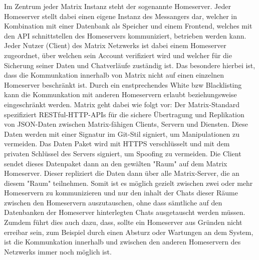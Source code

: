 Im Zentrum jeder Matrix Instanz steht der sogenannte Homeserver. Jeder Homeserver stellt dabei einen eigene Instanz des Messangers dar, welcher in Kombination mit einer Datenbank als Speicher und einem Frontend, welches mit den API schnittstellen des Homeservers kommuniziert, betrieben werden kann. Jeder Nutzer (Client) des Matrix Netzwerks ist dabei einem Homeserver zugeordnet, über welchen sein Account verifiziert wird und welcher für die Sicherung seiner Daten und Chatverläufe zuständig ist. Das besondere hierbei ist, dass die Kommunkation innerhalb von Matrix nicht auf einen einzelnen Homeserver beschränkt ist. Durch ein enstprechendes White bzw Blacklisting kann die Kommunkation mit anderen Homeservern erlaubt beziehungsweise eingeschränkt werden. Matrix geht dabei wie folgt vor:
Der Matrix-Standard spezifiziert RESTful-HTTP-APIs für die sichere Übertragung und Replikation von JSON-Daten zwischen Matrix-fähigen Clients, Servern und Diensten. Diese Daten werden mit einer Signatur im Git-Stil signiert, um Manipulationen zu vermeiden. Das Daten Paket wird mit HTTPS verschlüsselt und mit dem privaten Schlüssel des Servers signiert, um Spoofing zu vermeiden.
Die Client sendet dieses Datenpaket dann an den gewälten "Raum" auf dem Matrix Homeserver. Dieser repliziert die Daten dann über alle Matrix-Server, die an diesem "Raum" teilnehmen. Somit ist es möglich gezielt zwischen zwei oder mehr Homeservern zu kommunizieren und nur den inhalt der Chats dieser Räume zwischen den Homeservern auszutauschen, ohne dass sämtliche auf den Datenbanken der Homeserver hinterlegten Chats ausgetauscht werden müssen. Zumdem führt dies auch dazu, dass, sollte ein Homeserver aus Gründen nicht erreibar sein, zum Beispiel durch einen Absturz oder Wartungen an dem System, ist die Kommunkation innerhalb und zwischen den anderen Homeservern des Netzwerks immer noch möglich ist.

